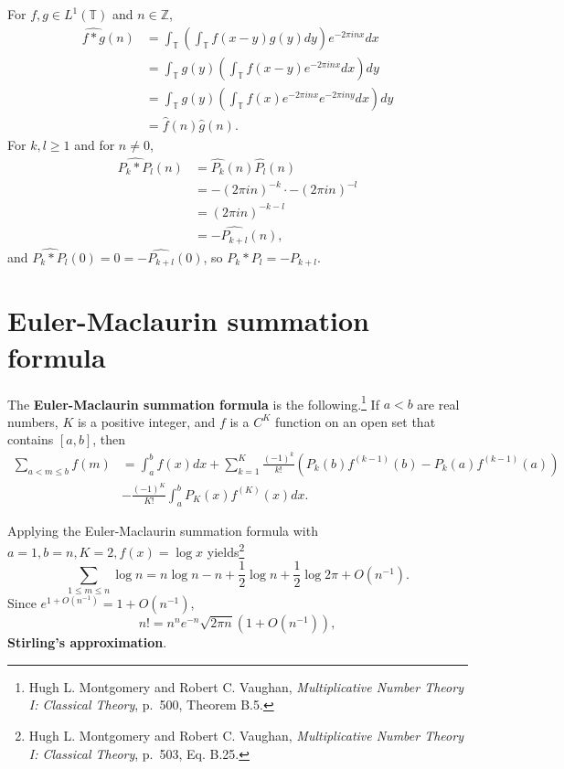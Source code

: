 \documentclass{article}
\theoremstyle{definition}
\begin{document}
For $f,g \in L^1(\mathbb{T})$ and $n \in \mathbb{Z}$,
\begin{align*}
\widehat{f*g}(n)&=\int_{\mathbb{T}} \left( \int_{\mathbb{T}} f(x-y) g(y) dy \right) e^{-2\pi inx} dx\\
&=\int_{\mathbb{T}} g(y) \left( \int_{\mathbb{T}} f(x-y) e^{-2\pi inx} dx \right) dy\\
&=\int_{\mathbb{T}} g(y) \left( \int_{\mathbb{T}} f(x) e^{-2\pi inx} e^{-2\pi iny} dx\right) dy\\
&=\widehat{f}(n) \widehat{g}(n).
\end{align*}
For $k,l \geq 1$ and for $n \neq 0$,
\begin{align*}
\widehat{P_k * P_l}(n)&=\widehat{P_k}(n) \widehat{P_l}(n)\\
&= - (2\pi in)^{-k} \cdot  - (2\pi in)^{-l}\\
&=(2\pi in)^{-k-l}\\
&=-\widehat{P_{k+l}}(n),
\end{align*}
and $\widehat{P_k * P_l}(0) = 0 = -\widehat{P_{k+l}}(0)$, so
$P_k * P_l = - P_{k+l}$. 



\section{Euler-Maclaurin summation formula}
The \textbf{Euler-Maclaurin summation formula} is the following.\footnote{Hugh L. Montgomery and Robert C. Vaughan,
{\em Multiplicative Number Theory I: Classical Theory}, p.~500, Theorem B.5.} If $a<b$ are real numbers,
$K$ is a positive integer, and $f$ is a $C^K$ function on an open set that contains $[a,b]$, then 
\begin{align*}
\sum_{a<m \leq b} f(m)&=\int_a^b f(x) dx + \sum_{k=1}^K \frac{(-1)^k}{k!} (P_k(b) f^{(k-1)}(b)-P_k(a) f^{(k-1)}(a))\\
&-\frac{(-1)^K}{K!} \int_a^b P_K(x)  f^{(K)}(x) dx.
\end{align*}

Applying the Euler-Maclaurin summation formula with $a=1, b=n, K=2, f(x)=\log x$ yields\footnote{Hugh L. Montgomery and Robert C. Vaughan,
{\em Multiplicative Number Theory I: Classical Theory}, p.~503, Eq. B.25.}
\[
\sum_{1 \leq m \leq n} \log n = n \log n - n  + \frac{1}{2} \log n + \frac{1}{2} \log 2\pi + O(n^{-1}).
\]
Since $e^{1+O(n^{-1})} = 1+O(n^{-1})$,
\[
n! = n^n e^{-n} \sqrt{2\pi n} (1+O(n^{-1})),
\]
\textbf{Stirling's approximation}. 
\end{document}
